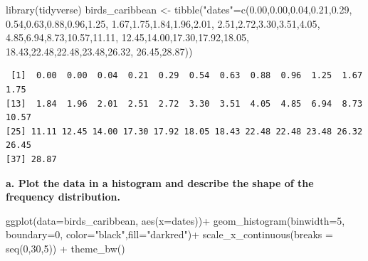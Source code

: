 \documentclass[
  a4paper,
  DIV=11,
  numbers=noendperiod]{scrreprt}
\newenvironment{Shaded}{\begin{snugshade}}{\end{snugshade}}
\newcommand{\AttributeTok}[1]{\textcolor[rgb]{0.40,0.45,0.13}{#1}}
\newcommand{\DecValTok}[1]{\textcolor[rgb]{0.68,0.00,0.00}{#1}}
\newcommand{\FloatTok}[1]{\textcolor[rgb]{0.68,0.00,0.00}{#1}}
\newcommand{\FunctionTok}[1]{\textcolor[rgb]{0.28,0.35,0.67}{#1}}
\newcommand{\NormalTok}[1]{\textcolor[rgb]{0.00,0.23,0.31}{#1}}
\newcommand{\OtherTok}[1]{\textcolor[rgb]{0.00,0.23,0.31}{#1}}
\newcommand{\SpecialCharTok}[1]{\textcolor[rgb]{0.37,0.37,0.37}{#1}}
\newcommand{\StringTok}[1]{\textcolor[rgb]{0.13,0.47,0.30}{#1}}
\begin{document}
\begin{Shaded}
\begin{Highlighting}[]
\FunctionTok{library}\NormalTok{(tidyverse)}
\NormalTok{birds\_caribbean }\OtherTok{\textless{}{-}} \FunctionTok{tibble}\NormalTok{(}\StringTok{"dates"}\OtherTok{=}\FunctionTok{c}\NormalTok{(}\FloatTok{0.00}\NormalTok{,}\FloatTok{0.00}\NormalTok{,}\FloatTok{0.04}\NormalTok{,}\FloatTok{0.21}\NormalTok{,}\FloatTok{0.29}\NormalTok{,}
\FloatTok{0.54}\NormalTok{,}\FloatTok{0.63}\NormalTok{,}\FloatTok{0.88}\NormalTok{,}\FloatTok{0.96}\NormalTok{,}\FloatTok{1.25}\NormalTok{,}
\FloatTok{1.67}\NormalTok{,}\FloatTok{1.75}\NormalTok{,}\FloatTok{1.84}\NormalTok{,}\FloatTok{1.96}\NormalTok{,}\FloatTok{2.01}\NormalTok{,}
\FloatTok{2.51}\NormalTok{,}\FloatTok{2.72}\NormalTok{,}\FloatTok{3.30}\NormalTok{,}\FloatTok{3.51}\NormalTok{,}\FloatTok{4.05}\NormalTok{,}
\FloatTok{4.85}\NormalTok{,}\FloatTok{6.94}\NormalTok{,}\FloatTok{8.73}\NormalTok{,}\FloatTok{10.57}\NormalTok{,}\FloatTok{11.11}\NormalTok{,}
\FloatTok{12.45}\NormalTok{,}\FloatTok{14.00}\NormalTok{,}\FloatTok{17.30}\NormalTok{,}\FloatTok{17.92}\NormalTok{,}\FloatTok{18.05}\NormalTok{,}
\FloatTok{18.43}\NormalTok{,}\FloatTok{22.48}\NormalTok{,}\FloatTok{22.48}\NormalTok{,}\FloatTok{23.48}\NormalTok{,}\FloatTok{26.32}\NormalTok{,}
\FloatTok{26.45}\NormalTok{,}\FloatTok{28.87}\NormalTok{))}
\end{Highlighting}
\end{Shaded}

\begin{Shaded}
\end{Shaded}

\begin{verbatim}
 [1]  0.00  0.00  0.04  0.21  0.29  0.54  0.63  0.88  0.96  1.25  1.67  1.75
[13]  1.84  1.96  2.01  2.51  2.72  3.30  3.51  4.05  4.85  6.94  8.73 10.57
[25] 11.11 12.45 14.00 17.30 17.92 18.05 18.43 22.48 22.48 23.48 26.32 26.45
[37] 28.87
\end{verbatim}

\textbf{a. Plot the data in a histogram and describe the shape of the
frequency distribution.}

\begin{Shaded}
\begin{Highlighting}[]
\FunctionTok{ggplot}\NormalTok{(}\AttributeTok{data=}\NormalTok{birds\_caribbean, }\FunctionTok{aes}\NormalTok{(}\AttributeTok{x=}\NormalTok{dates))}\SpecialCharTok{+}
  \FunctionTok{geom\_histogram}\NormalTok{(}\AttributeTok{binwidth=}\DecValTok{5}\NormalTok{, }\AttributeTok{boundary=}\DecValTok{0}\NormalTok{, }\AttributeTok{color=}\StringTok{"black"}\NormalTok{,}\AttributeTok{fill=}\StringTok{"darkred"}\NormalTok{)}\SpecialCharTok{+}
  \FunctionTok{scale\_x\_continuous}\NormalTok{(}\AttributeTok{breaks =} \FunctionTok{seq}\NormalTok{(}\DecValTok{0}\NormalTok{,}\DecValTok{30}\NormalTok{,}\DecValTok{5}\NormalTok{)) }\SpecialCharTok{+}
  \FunctionTok{theme\_bw}\NormalTok{()}
\end{Highlighting}
\end{Shaded}
\end{document}

